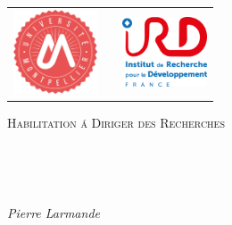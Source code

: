 \documentclass[
11pt, %
french, %
singlespacing, %
headsepline, %
]{MastersDoctoralThesis} %
\author{Pierre \textsc{Larmande}} %
\begin{document}
\frontmatter %

\pagestyle{plain} %


\begin{titlepage}
\begin{tabular}{ l l l}
\includegraphics[width=2.5cm]{logoUM.png} & \hspace{7cm}  & \includegraphics[width=2.5cm]{logoIRD.png}
\end{tabular} 
\vspace{1.5cm}
\begin{center}

\textsc{\LARGE Habilitation \'{a} Diriger des Recherches}\\[0.5cm] %

{\scshape\Large \univname\par}\vspace{1.5cm} %


\HRule \\[0.4cm] %
{\huge \bfseries \ttitle\par}\vspace{0.4cm} %
\HRule \\[1.5cm] %
 
\begin{center}
\huge \emph{Pierre Larmande}
\end{center}
 

\end{center}
\end{titlepage}
\end{document}
